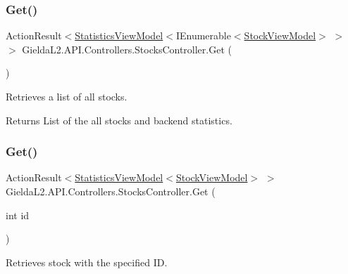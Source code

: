 \subsubsection{\texorpdfstring{Get()}{Get()}\hspace{0.1cm}{\footnotesize\ttfamily [1/2]}}
{\footnotesize\ttfamily Action\+Result$<$\mbox{\hyperlink{class_gielda_l2_1_1_a_p_i_1_1_view_models_1_1_view_1_1_statistics_view_model}{Statistics\+View\+Model}}$<$I\+Enumerable$<$\mbox{\hyperlink{class_gielda_l2_1_1_a_p_i_1_1_view_models_1_1_view_1_1_stock_view_model}{Stock\+View\+Model}}$>$ $>$ $>$ Gielda\+L2.\+A\+P\+I.\+Controllers.\+Stocks\+Controller.\+Get (\begin{DoxyParamCaption}{ }\end{DoxyParamCaption})}



Retrieves a list of all stocks. 

\begin{DoxyReturn}{Returns}
List of the all stocks and backend statistics.
\end{DoxyReturn}
\mbox{\label{class_gielda_l2_1_1_a_p_i_1_1_controllers_1_1_stocks_controller_acbb679302b68f67ebfc9c22184332f27}} 
\subsubsection{\texorpdfstring{Get()}{Get()}\hspace{0.1cm}{\footnotesize\ttfamily [2/2]}}
{\footnotesize\ttfamily Action\+Result$<$\mbox{\hyperlink{class_gielda_l2_1_1_a_p_i_1_1_view_models_1_1_view_1_1_statistics_view_model}{Statistics\+View\+Model}}$<$\mbox{\hyperlink{class_gielda_l2_1_1_a_p_i_1_1_view_models_1_1_view_1_1_stock_view_model}{Stock\+View\+Model}}$>$ $>$ Gielda\+L2.\+A\+P\+I.\+Controllers.\+Stocks\+Controller.\+Get (\begin{DoxyParamCaption}\item[{int}]{id }\end{DoxyParamCaption})}



Retrieves stock with the specified ID. 


